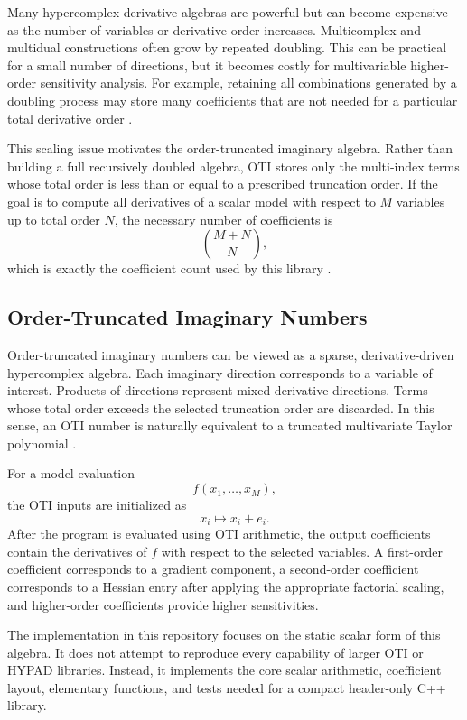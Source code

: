 \documentclass[11pt]{article}
\begin{document}
Many hypercomplex derivative algebras are powerful but can become expensive as
the number of variables or derivative order increases. Multicomplex and
multidual constructions often grow by repeated doubling. This can be practical
for a small number of directions, but it becomes costly for multivariable
higher-order sensitivity analysis. For example, retaining all combinations
generated by a doubling process may store many coefficients that are not needed
for a particular total derivative order \cite{Fike2011,Lantoine2012,Cano2020}.

This scaling issue motivates the order-truncated imaginary algebra. Rather
than building a full recursively doubled algebra, OTI stores only the
multi-index terms whose total order is less than or equal to a prescribed
truncation order. If the goal is to compute all derivatives of a scalar model
with respect to \(M\) variables up to total order \(N\), the necessary number
of coefficients is
\[
    {M+N \choose N},
\]
which is exactly the coefficient count used by this library \cite{Cano2020}.

\subsection{Order-Truncated Imaginary Numbers}

Order-truncated imaginary numbers can be viewed as a sparse, derivative-driven
hypercomplex algebra. Each imaginary direction corresponds to a variable of
interest. Products of directions represent mixed derivative directions. Terms
whose total order exceeds the selected truncation order are discarded. In this
sense, an OTI number is naturally equivalent to a truncated multivariate
Taylor polynomial \cite{Cano2020}.

For a model evaluation
\[
    f(x_1,\ldots,x_M),
\]
the OTI inputs are initialized as
\[
    x_i \mapsto x_i + e_i.
\]
After the program is evaluated using OTI arithmetic, the output coefficients
contain the derivatives of \(f\) with respect to the selected variables. A
first-order coefficient corresponds to a gradient component, a second-order
coefficient corresponds to a Hessian entry after applying the appropriate
factorial scaling, and higher-order coefficients provide higher sensitivities.

The implementation in this repository focuses on the static scalar form of
this algebra. It does not attempt to reproduce every capability of larger OTI
or HYPAD libraries. Instead, it implements the core scalar arithmetic,
coefficient layout, elementary functions, and tests needed for a compact
header-only C++ library.
\end{document}
